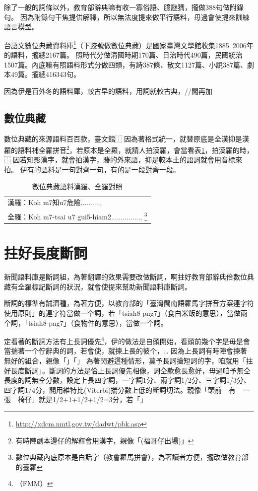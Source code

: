 \documentclass[final,oneside,onecolumn,12pt,a4paper]{book}%
\begin{document}
除了一般的詞條以外，教育部辭典嘛有收一寡俗語、臆謎猜，攏做388句做附錄句。
因為附錄句干焦提供解釋，所以無法度提來做平行語料，毋過會使提來訓練語言模型。

台語文數位典藏資料庫\footnote{\url{http://xdcm.nmtl.gov.tw/dadwt/pbk.asp}}（下跤號做數位典藏）是國家臺灣文學館收集1885~2006年的語料，攏總2167篇。
照時代分做清國時期170篇、日治時代490篇，民國統治1507篇。內底嘛有照語料形式分做四類，有詩387條、散文1127篇、小說387篇、劇本49篇。攏總416343句。

因為伊是百外冬的語料庫，較古早的語料，用詞就較古典，//閣再加

\subsection{數位典藏}
\label{節：數位典藏}
數位典藏的來源語料百百款，臺文館⿰因為著格式統一，就替原底是全漢抑是漢羅的語料補全羅拼音\footnote{有時陣劇本邊仔的解釋會用漢字，親像「(福哥仔出場)」}，若原本是全羅，就請人拍漢羅，會當看表\ref{表：數位典藏語料}，拍漢羅的時，⿰因若知影漢字，就會拍漢字，賰的外來語，抑是較本土的語詞就會用音標來拍。
伊有的語料是一句對齊一句，有的是一段對齊一段。

\begin{table}
\caption{數位典藏語料漢羅、全羅對照}
\label{表：數位典藏語料}
\centering
\begin{tabular}{l}
漢羅：Koh m7知u7危險.........., \\
全羅：Koh m7-tsai u7 gui5-hiam2..............., \footnote{數位典藏內底原本是白話字（教會羅馬拼會），為著讀者方便，攏改做教育部的臺羅}\\
\end{tabular}
\end{table}

\section{拄好長度斷詞}
\label{節：拄好長度斷詞}
新聞語料庫是斷詞組，為著翻譯的效果需要改做斷詞，啊拄好教育部辭典佮數位典藏有全羅標記斷詞的狀況，就會使提來幫助新聞語料庫斷詞。

斷詞的標準有誠濟種，為著方便，以教育部的「臺灣閩南語羅馬字拼音方案連字符使用原則」的連字符當做一个詞，若「tsiah8 png7」（食白米飯的意思），當做兩个詞，「tsiah8-png7」（食物件的意思），當做一个詞。

定看著的斷詞方法有上長詞優先\footnote{（FMM）}，伊的做法是自頭開始，看頭前幾个字是毋是會當揣著一个佇辭典的詞，若會使，就揀上長的彼个，…%
因為上長詞有時陣會揀著無好的組合，親像「」「」
為著閃避這種情形，莫予長詞搶短詞的字，咱就用「拄好長度斷詞」。斷詞的方法是佮上長詞優先相像，詞仝款愈長愈好，毋過咱予無仝長度的詞無仝分數，設定上長四字詞，一字詞1分、兩字詞1/2分、三字詞1/3分、四字詞1/4分，閣用維特比(Viterbi)揣分數上低的斷詞切法。親像「頭前　有　一張　椅仔」就是1/2+1+1/2+1/2=3分，若「」%
\end{document}
